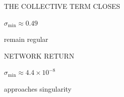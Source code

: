 {\begin{minipage}[t][\PosterFourHeight][t]{\PosterHalfWidth}
\begin{PosterPanel}{\PosterFourHeight}{}{THE COLLECTIVE TERM CLOSES}
\begin{minipage}[t]{153mm}
      {\MetricSize\bfseries\color{IASDarkText}$\sigma_{\min}\approx0.49$\par}
      {\TableSize\color{IASDarkText}remain regular\par}
      \vspace{8mm}
      {\PosterCompactHeadingType\color{IASVermillion}NETWORK RETURN\par}
      {\EquationSize\bfseries\color{IASDarkText}$\sigma_{\min}\approx4.4\times10^{-8}$\par}
      {\TableSize\color{IASDarkText}approaches singularity\par}
    \end{minipage}\par
  \end{PosterPanel}
\end{minipage}%
}%
\ifdefined\PosterFull
  \PosterSectionContent
  \let\PosterSectionFinish\relax
\else
  \def\PosterPageWidth{\PosterPreviewHalfPageWidth}
  \def\PosterPageHeight{\PosterPreviewFourPageHeight}
  \def\PosterPreviewLeft{\PosterPreviewHalfLeft}
  
  \begin{frame}[t]
  \vspace*{\PosterPreviewTop}
  \noindent\hspace*{\PosterPreviewLeft}%
  \PosterSectionContent
  \end{frame}
  \def\PosterSectionFinish{}
\fi
\PosterSectionFinish
